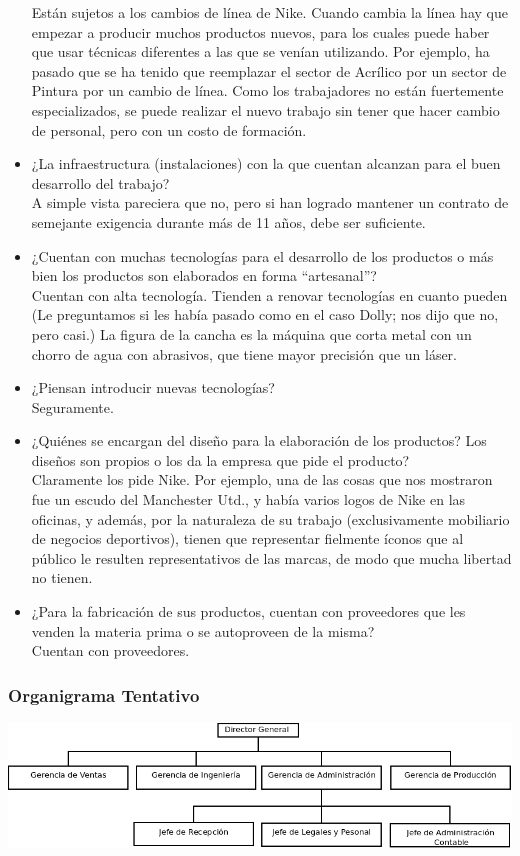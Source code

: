 \documentclass[a4paper,10pt,titlepage]{article}
\begin{document}
\begin{itemize}
Est\'an sujetos a los cambios de l\'inea de Nike. Cuando cambia la l\'inea hay que empezar a producir muchos productos nuevos,
 para los cuales puede haber que usar t\'ecnicas diferentes a las que se ven\'ian utilizando. 
Por ejemplo, ha pasado que se ha tenido que reemplazar el sector de Acr\'ilico por un sector de Pintura por un cambio de l\'inea. 
Como los trabajadores no est\'an fuertemente especializados, se puede realizar el nuevo trabajo sin tener que hacer cambio de personal, pero con un costo de formaci\'on.
\item ¿La infraestructura (instalaciones) con la que cuentan alcanzan para el buen desarrollo del trabajo? \\
 A simple vista pareciera que no, pero si han logrado mantener un contrato de semejante exigencia durante m\'as de 11 años, debe ser suficiente.
\item ¿Cuentan con muchas tecnolog\'ias para el desarrollo de los productos o m\'as bien los productos son elaborados en forma ``artesanal''? \\
Cuentan con alta tecnolog\'ia. Tienden a renovar tecnolog\'ias en cuanto pueden (Le preguntamos si les hab\'ia pasado como en el caso Dolly; nos dijo que no, pero casi.) La figura de la cancha es la m\'aquina que corta metal con un chorro de agua con abrasivos, que tiene mayor precisi\'on que un l\'aser.
\item ¿Piensan introducir nuevas tecnolog\'ias? \\
Seguramente.
\item ¿Qui\'enes se encargan del diseño para la elaboraci\'on de los productos? Los diseños son propios o los da la empresa que pide el producto? \\
Claramente los pide Nike. Por ejemplo, una de las cosas que nos mostraron fue un escudo del Manchester Utd., y hab\'ia varios logos de Nike en las oficinas, 
y adem\'as, por la naturaleza de su trabajo (exclusivamente mobiliario de negocios deportivos), tienen que representar fielmente \'iconos que al p\'ublico le resulten 
representativos de las marcas, de modo que mucha libertad no tienen.
\item ¿Para la fabricaci\'on de sus productos, cuentan con proveedores que les venden la materia prima o se autoproveen de la misma? \\
Cuentan con proveedores. 
\end{itemize}

\subsubsection*{\textbf{Organigrama Tentativo}}
\begin {center}
	\includegraphics[angle=90,scale=0.55]{./Organigramas/IcomOrganigramaNuestro1.png}
\end{center}
\end{document}
